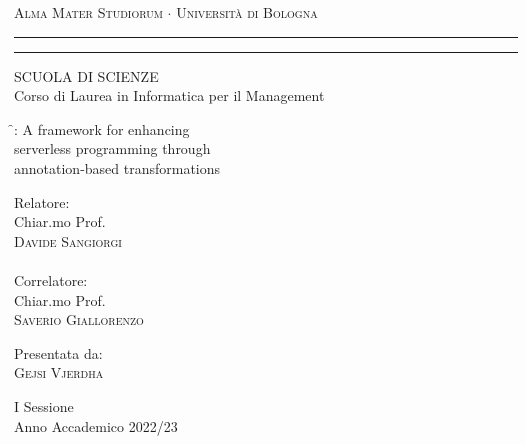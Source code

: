 \begin{otherlanguage}{italian}
\begin{titlepage}
\begin{center}
{{\Large{\textsc{Alma Mater Studiorum $\cdot$ Universit\`a di
Bologna}}}} \rule[0.1cm]{15.8cm}{0.1mm}
\rule[0.5cm]{15.8cm}{0.6mm}
{\small{ SCUOLA DI SCIENZE\\
Corso di Laurea in Informatica per il Management}}
\end{center}
\vspace{15mm}
\begin{center}
{\LARGE{ \f{}: A framework for enhancing  }}\\ %
\vspace{3mm}
{\LARGE{ serverless programming through  }}\\
\vspace{3mm}
{\LARGE{ annotation-based transformations }}\\
\end{center}
\vspace{40mm}
\par
\noindent
\begin{minipage}[t]{0.47\textwidth}
{\large{ Relatore:\\
Chiar.mo Prof.\\
\textsc{Davide Sangiorgi}\\\\
Correlatore:\\
Chiar.mo Prof.\\
\textsc{Saverio Giallorenzo}}}
\end{minipage}
\hfill
\begin{minipage}[t]{0.47\textwidth}\raggedleft
{\large{ Presentata da:\\
\textsc{Gejsi Vjerdha}}}
\end{minipage}
\vspace{20mm}
\begin{center}
{\large{ I Sessione\\
Anno Accademico 2022/23 }}%
\end{center}
\end{titlepage}
\end{otherlanguage}
